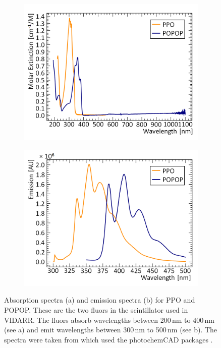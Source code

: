 \begin{figure}[!h]
\centering
\begin{subfigure}{.45\textwidth}
  \centering
  \includegraphics[width=\linewidth]{Chapter4/Figs/ppo_popop_absorption_graph.png}
  \captionsetup{width=.9\linewidth}
  \caption{}
  \label{subFig:ppoPopopAbsorb}
\end{subfigure}%
\qquad
\begin{subfigure}{.45\textwidth}
  \centering
  \includegraphics[width=\linewidth]{Chapter4/Figs/ppo_popop_emission_graph_adjust.png}
  \captionsetup{width=.9\linewidth}
  \caption{}
  \label{subFig:ppoPopopEmiss}
\end{subfigure}
\caption[Absorption and emission spectra for PPO and POPOP.]{Absorption spectra (a) and emission spectra (b) for PPO and POPOP. These are the two fluors in the scintillator used in VIDARR. The fluors absorb wavelengths between 200\,nm to 400\,nm  (see a) and emit wavelengths between 300\,nm to 500\,nm (see b). The spectra were taken from \cite{omlcPPO} \cite{omlcPOPOP} which used the photochemCAD packages \cite{du98photochemcad} \cite{dixon2005photochemcad}. }
\label{fig:ppoPopopAbsorbEmiss}
\end{figure}

